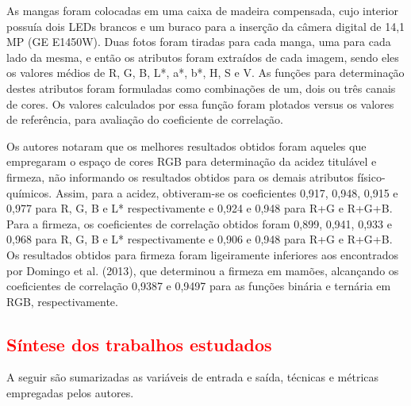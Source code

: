 As mangas foram colocadas em uma caixa de madeira compensada, cujo interior possuía dois LEDs brancos e um buraco para a inserção da câmera digital de 14,1 MP (GE E1450W). Duas fotos foram tiradas para cada manga, uma para cada lado da mesma, e então os atributos foram extraídos de cada imagem, sendo eles os valores médios de R, G, B, L*, a*, b*, H, S e V. As funções para determinação destes atributos foram formuladas como combinações de um, dois ou três canais de cores. Os valores calculados por essa função foram plotados versus os valores de referência, para avaliação do coeficiente de correlação. 

Os autores notaram que os melhores resultados obtidos foram aqueles que empregaram o espaço de cores RGB para determinação da acidez titulável e firmeza, não informando os resultados obtidos para os demais atributos físico-químicos. Assim, para a acidez, obtiveram-se os coeficientes 0,917, 0,948, 0,915 e 0,977 para R, G, B e L* respectivamente e 0,924 e 0,948 para R+G e R+G+B. Para a firmeza, os coeficientes de correlação obtidos foram 0,899, 0,941, 0,933 e 0,968 para R, G, B e L* respectivamente e 0,906 e 0,948 para R+G e R+G+B. Os resultados obtidos para firmeza foram ligeiramente inferiores aos encontrados por Domingo et al. (2013), que determinou a firmeza em mamões, alcançando os coeficientes de correlação 0,9387 e 0,9497 para as funções binária e ternária em RGB, respectivamente. 	

\subsection{\textcolor{red}{Síntese dos trabalhos estudados}}

A seguir são sumarizadas as variáveis de entrada e saída, técnicas e métricas empregadas pelos autores.

